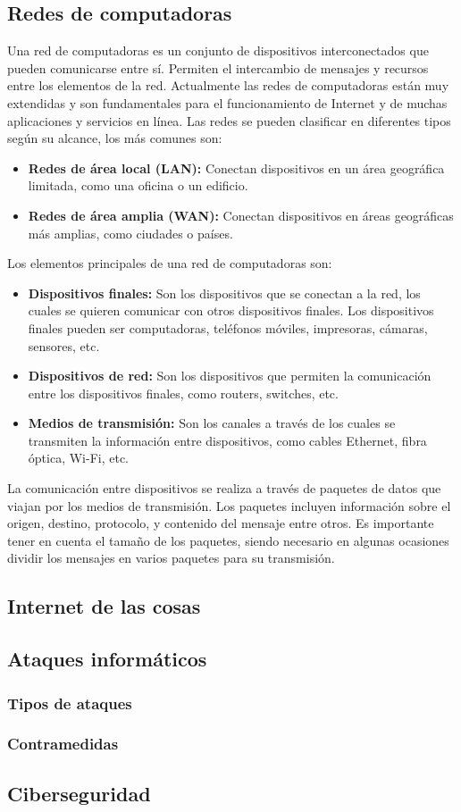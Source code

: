 \subsection{Redes de computadoras}
Una red de computadoras es un conjunto de dispositivos interconectados que pueden comunicarse entre sí. Permiten el intercambio de mensajes y recursos entre los elementos de la red. Actualmente las redes de computadoras están muy extendidas y son fundamentales para el funcionamiento de Internet y de muchas aplicaciones y servicios en línea.
Las redes se pueden clasificar en diferentes tipos según su alcance, los más comunes son:
\begin{itemize}
	\item \textbf{Redes de área local (LAN):} Conectan dispositivos en un área geográfica limitada, como una oficina o un edificio.
	\item \textbf{Redes de área amplia (WAN):} Conectan dispositivos en áreas geográficas más amplias, como ciudades o países.
\end{itemize}

Los elementos principales de una red de computadoras son:
\begin{itemize}
	\item \textbf{Dispositivos finales:} Son los dispositivos que se conectan a la red, los cuales se quieren comunicar con otros dispositivos finales. Los dispositivos finales pueden ser computadoras, teléfonos móviles, impresoras, cámaras, sensores, etc.
	\item \textbf{Dispositivos de red:} Son los dispositivos que permiten la comunicación entre los dispositivos finales, como routers, switches, etc.
	\item \textbf{Medios de transmisión:} Son los canales a través de los cuales se transmiten la información entre dispositivos, como cables Ethernet, fibra óptica, Wi-Fi, etc.
\end{itemize}

La comunicación entre dispositivos se realiza a través de paquetes de datos que viajan por los medios de transmisión. Los paquetes incluyen información sobre el origen, destino, protocolo, y contenido del mensaje entre otros. Es importante tener en cuenta el tamaño de los paquetes, siendo necesario en algunas ocasiones dividir los mensajes en varios paquetes para su transmisión.


\subsection{Internet de las cosas}

\subsection{Ataques informáticos}

\subsubsection{Tipos de ataques}

\subsubsection{Contramedidas}

\subsection{Ciberseguridad}





